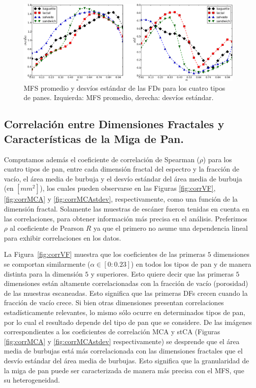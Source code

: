 \begin{figure}[h!]
\centering
\includegraphics[width=12cm]{figures/panstd}
\caption[MFS promedio y desvíos estándar de las FDs para los cuatro tipos de panes]{MFS promedio y desvíos estándar de las FDs para los cuatro tipos de panes. Izquierda: MFS promedio, derecha: desvíos estándar.}
\label{fig:meansMFS}
\end{figure}

\subsection{Correlación entre Dimensiones Fractales y Características de la Miga de Pan.}

Computamos además el coeficiente de correlación de Spearman ($\rho$) para los cuatro tipos de pan, entre cada dimensión fractal del espectro y la fracción de vacío, el área media de burbuja y el desvío estándar del área media de burbuja (en $[mm^{2}]$), los cuales pueden observarse en las Figuras \ref{fig:corrVF}, \ref{fig:corrMCA} y \ref{fig:corrMCAstdev}, respectivamente, como una función de la dimensión fractal.
Solamente las muestras de escáner fueron tenidas en cuenta en las correlaciones, para obtener información más precisa en el análisis.
Preferimos $\rho$ al coeficiente de Pearson $R$ ya que el primero no asume una dependencia lineal para exhibir correlaciones en los datos.

La Figura~\ref{fig:corrVF} muestra que los coeficientes de las primeras $5$ dimensiones se comportan similarmente ($\alpha \in [0: 0.23]$) en todos los tipos de pan y de manera distinta para la dimensión $5$ y superiores. Esto quiere decir que las primeras $5$ dimensiones están altamente correlacionadas con la fracción de vacío (porosidad) de las muestras escaneadas.
Esto significa que las primeras DFs crecen cuando la fracción de vacío crece.
Si bien otras dimensiones presentan correlaciones estadísticamente relevantes, lo mismo sólo ocurre en determinados tipos de pan, por lo cual el resultado depende del tipo de pan que se considere.
De las imágenes correspondientes a los coeficientes de correlación MCA y stCA (Figuras \ref{fig:corrMCA} y \ref{fig:corrMCAstdev} respectivamente) se desprende que el área media de burbujas está más correlacionada con las dimensiones fractales que el desvío estándar del área media de burbujas. Esto significa que la granularidad de la miga de pan puede ser caracterizada de manera más precisa con el MFS, que su heterogeneidad.


